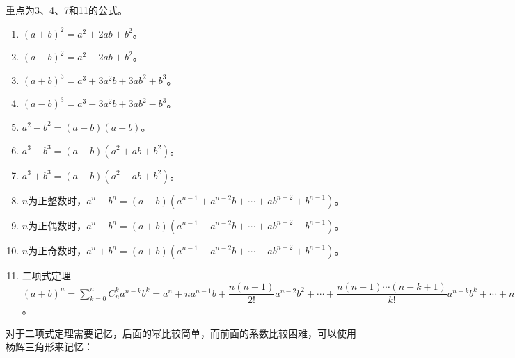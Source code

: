 \documentclass[UTF8, 12pt]{ctexart}
\begin{document}
重点为3、4、7和11的公式。

\begin{enumerate}
    \item $(a+b)^2=a^2+2ab+b^2$。
    \item $(a-b)^2=a^2-2ab+b^2$。
    \item $(a+b)^3=a^3+3a^2b+3ab^2+b^3$。
    \item $(a-b)^3=a^3-3a^2b+3ab^2-b^3$。
    \item $a^2-b^2=(a+b)(a-b)$。
    \item $a^3-b^3=(a-b)(a^2+ab+b^2)$。
    \item $a^3+b^3=(a+b)(a^2-ab+b^2)$。
    \item $n$为正整数时，$a^n-b^n=(a-b)(a^{n-1}+a^{n-2}b+\cdots+ab^{n-2}+b^{n-1})$。
    \item $n$为正偶数时，$a^n-b^n=(a+b)(a^{n-1}-a^{n-2}b+\cdots+ab^{n-2}-b^{n-1})$。
    \item $n$为正奇数时，$a^n+b^n=(a+b)(a^{n-1}-a^{n-2}b+\cdots-ab^{n-2}+b^{n-1})$。
    \item 二项式定理$(a+b)^n=\sum_{k=0}^nC_n^ka^{n-k}b^k=a^n+na^{n-1}b+\dfrac{n(n-1)}{2!}a^{n-2}b^2+\cdots+\dfrac{n(n-1)\cdots(n-k+1)}{k!}a^{n-k}b^k+\cdots+nab^{n-1}+b^n$。
\end{enumerate}

对于二项式定理需要记忆，后面的幂比较简单，而前面的系数比较困难，可以使用杨辉三角形来记忆：
\end{document}
